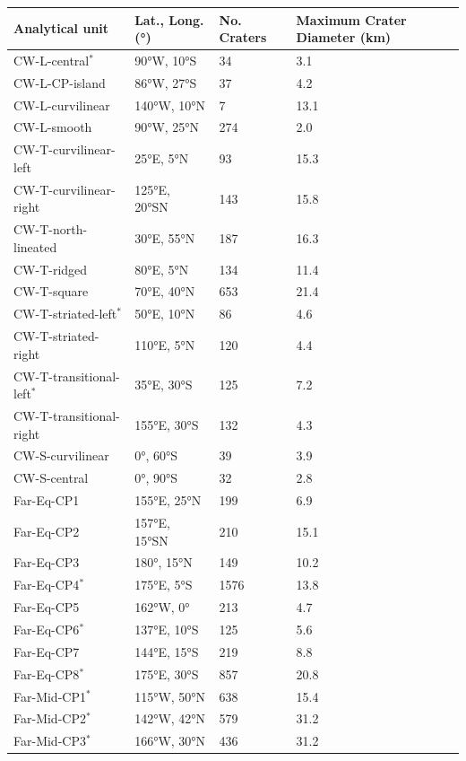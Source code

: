 \documentclass[preprint,11pt,3p,times,authoryear]{elsarticle}
\begin{document}
\begin{table}[ht!]
\centering
  \begin{tabular}{p{4.0cm} p{3.0cm} p{2.0cm} p{3.0cm}}
\hline
    \textbf{Analytical unit} & \textbf{Lat., Long. (°)} & \textbf{No. Craters} & \textbf{Maximum Crater Diameter (km)}  \\
\hline
  CW-L-central$^{*}$ & 90°W, 10°S & 34 & 3.1 \\
  CW-L-CP-island & 86°W, 27°S  & 37 & 4.2 \\ %
  CW-L-curvilinear &  140°W, 10°N & 7 &  13.1 \\
  CW-L-smooth &  90°W, 25°N & 274 &  2.0 \\
  CW-T-curvilinear-left & 25°E, 5°N & 93 &  15.3\\
  CW-T-curvilinear-right & 125°E, 20°SN & 143 &  15.8\\
  CW-T-north-lineated & 30°E, 55°N & 187 &  16.3\\
  CW-T-ridged & 80°E, 5°N & 134 &  11.4 \\
  CW-T-square & 70°E, 40°N & 653 &  21.4 \\
  CW-T-striated-left$^{*}$ & 50°E, 10°N & 86 & 4.6 \\
  CW-T-striated-right & 110°E, 5°N & 120 & 4.4 \\
  CW-T-transitional-left$^{*}$ & 35°E, 30°S & 125 & 7.2 \\
  CW-T-transitional-right & 155°E, 30°S & 132 &  4.3 \\
  CW-S-curvilinear & 0°, 60°S & 39 &  3.9 \\
  CW-S-central & 0°, 90°S & 32 &  2.8 \\
  Far-Eq-CP1 & 155°E, 25°N & 199 &  6.9 \\
  Far-Eq-CP2 & 157°E, 15°SN & 210 &  15.1 \\
  Far-Eq-CP3 & 180°, 15°N & 149 &  10.2\\
  Far-Eq-CP4$^{*}$ & 175°E, 5°S & 1576 & 13.8 \\
  Far-Eq-CP5 & 162°W, 0° & 213 &  4.7 \\
  Far-Eq-CP6$^{*}$ & 137°E, 10°S & 125 & 5.6 \\
  Far-Eq-CP7 & 144°E, 15°S & 219 &  8.8 \\
  Far-Eq-CP8$^{*}$ & 175°E, 30°S & 857 & 20.8\\
  Far-Mid-CP1$^{*}$ & 115°W, 50°N & 638 & 15.4 \\
  Far-Mid-CP2$^{*}$ & 142°W, 42°N & 579 & 31.2 \\
  Far-Mid-CP3$^{*}$ & 166°W, 30°N & 436 & 31.2\\

\end{tabular}
\end{table}
\end{document}
